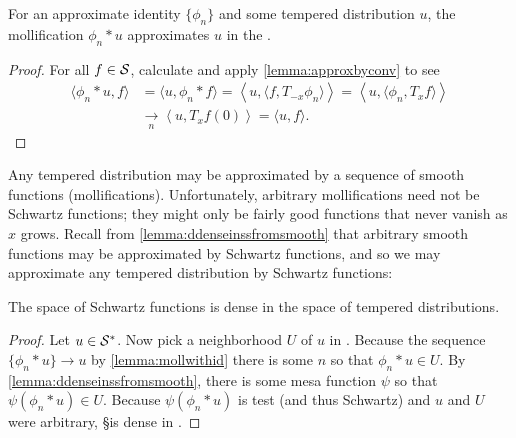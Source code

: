     \begin{lemma}
      \label{lemma:mollwithid}
      For an approximate identity $\{\phi_n\}$ and some tempered distribution $u$, the mollification $\phi_n*u$ approximates $u$ in the \ws.
    \end{lemma}
    \begin{proof}
      For all $f\in\S$, calculate and apply \cref{lemma:approxbyconv} to see
      \begin{align*}
        \langle \phi_n*u, f\rangle
        &= \langle u, \phi_n*f\rangle
        = \left\langle u, \langle f, T_{-x}\phi_n\rangle \right\rangle
        = \left\langle u, \langle \phi_n, T_{x}f\rangle \right\rangle
        \\&\underset{n}{\longrightarrow} \left\langle u, T_xf(0) \right\rangle
        = \langle u,f\rangle \text{.}
      \end{align*}
    \end{proof}

    Any tempered distribution may be approximated by a sequence of smooth functions (mollifications).
    Unfortunately, arbitrary mollifications need not be Schwartz functions; they might only be fairly good functions that never vanish as $x$ grows.
    Recall from \cref{lemma:ddenseinssfromsmooth} that arbitrary smooth functions may be approximated by Schwartz functions, and so we may approximate any tempered distribution by Schwartz functions:

    \begin{thm}
      \label{thm:sdenseinss}
      The space of Schwartz functions is dense in the space of tempered distributions.
    \end{thm}
    \begin{proof}
      Let $u\in\SS$.
      Now pick a neighborhood $U$ of $u$ in \SS.
      Because the sequence $\{\phi_n*u\}\rightarrow u$ by \cref{lemma:mollwithid} there is some $n$ so that $\phi_n*u\in U$.
      By \cref{lemma:ddenseinssfromsmooth}, there is some mesa function $\psi$ so that $\psi(\phi_n*u)\in U$.
      Because $\psi(\phi_n*u)$ is test (and thus Schwartz) and $u$ and $U$ were arbitrary, \S is dense in \SS.
    \end{proof}



